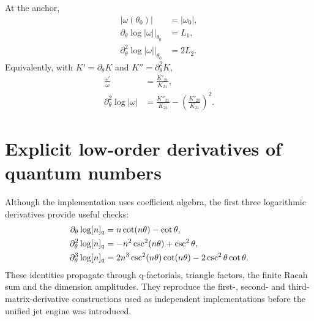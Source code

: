 \begin{corollary}
\label{cor:firstobservables}
At the anchor,
\begin{align}
|\omega(\theta_0)|&=|\omega_0|,\\
\partial_\theta\log|\omega|\big|_{\theta_0}&=L_1,\\
\partial_\theta^2\log|\omega|\big|_{\theta_0}&=2L_2.
\end{align}
Equivalently, with $K'=\partial_\theta K$ and $K''=\partial_\theta^2K$,
\begin{align}
\frac{\omega'}{\omega}&=\frac{K'_{21}}{K_{21}},\\
\partial_\theta^2\log|\omega|
&=\frac{K''_{21}}{K_{21}}-
\left(\frac{K'_{21}}{K_{21}}\right)^2.
\end{align}
\end{corollary}

\section{Explicit low-order derivatives of quantum numbers}
Although the implementation uses coefficient algebra, the first three logarithmic derivatives provide useful checks:
\begin{align}
\partial_\theta\log[n]_q
&=n\cot(n\theta)-\cot\theta,
\label{eq:d1q}\\
\partial_\theta^2\log[n]_q
&=-n^2\csc^2(n\theta)+\csc^2\theta,
\label{eq:d2q}\\
\partial_\theta^3\log[n]_q
&=2n^3\csc^2(n\theta)\cot(n\theta)
-2\csc^2\theta\cot\theta.
\label{eq:d3q}
\end{align}
These identities propagate through q-factorials, triangle factors, the finite Racah sum and the dimension amplitudes.  They reproduce the first-, second- and third-matrix-derivative constructions used as independent implementations before the unified jet engine was introduced.
